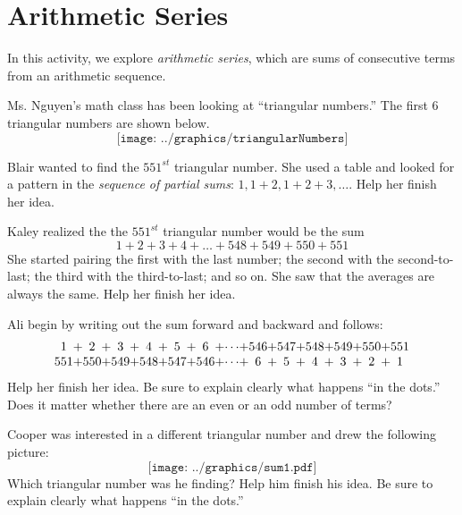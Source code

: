 \newpage
\section{Arithmetic Series}\label{A:arithmeticSeries}

In this activity, we explore \emph{arithmetic series}, which are sums of consecutive terms from an arithmetic sequence.

Ms. Nguyen's math class has been looking at ``triangular numbers.''  The first 6 triangular numbers are shown below. 
\[
\texttt{[image: ../graphics/triangularNumbers]}
\]

\begin{prob}
Blair wanted to find the $551^{st}$ triangular number.  She used a table and looked for a pattern in the \emph{sequence of partial sums}:  $1, 1+2, 1+2+3, \dots$.  Help her finish her idea.  
\end{prob}

\begin{prob}
Kaley realized the the $551^{st}$ triangular number would be the sum 
\[
1+2+3+4+\dots+548+549+550+551
\]
She started pairing the first with the last number; the second with the second-to-last; the third with the third-to-last; and so on.  She saw that the averages are always the same.  Help her finish her idea.  
\end{prob}

\begin{prob}
Ali begin by writing out the sum forward and backward and follows:  
\[
\begin{array}{c@{ + }c@{ + }c@{ + }c@{ + }c@{ + }c@{ + }c@{ + }c@{ + }c@{ + }c@{ + }c@{ + }c@{ + }c}
1 & 2 & 3 & 4 & 5 & 6 & \cdots & 546 & 547 & 548 & 549 & 550 & 551 \\
551 & 550 & 549 & 548 & 547 & 546 & \cdots & 6 & 5 & 4 & 3 & 2 & 1 
\end{array}
\]
Help her finish her idea.  Be sure to explain clearly what happens ``in the dots.''  Does it matter whether there are an even or an odd number of terms?  
\end{prob}

\begin{prob}
Cooper was interested in a different triangular number and drew the following picture:   
\[
\texttt{[image: ../graphics/sum1.pdf]}
\]
Which triangular number was he finding?  Help him finish his idea.  Be sure to explain clearly what 
happens ``in the dots.'' 
\end{prob}


